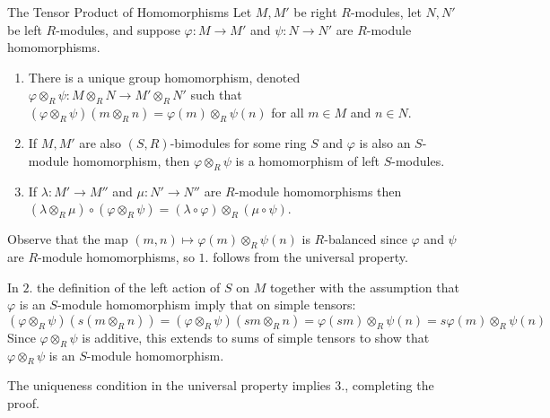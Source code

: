 \documentclass[12pt, a4paper, twoside, openright, titlepage]{book}
\begin{document}
\begin{thm}{The Tensor Product of Homomorphisms}{}
    Let $M,M'$ be right $R$-modules, let $N,N'$ be left $R$-modules, and suppose $\varphi:M\rightarrow M'$ and $\psi:N\rightarrow N'$ are $R$-module homomorphisms.
    \begin{enumerate}
        \item There is a unique group homomorphism, denoted $\varphi\otimes_R\psi:M\otimes_RN\rightarrow M'\otimes_RN'$ such that $(\varphi\otimes_R\psi)(m\otimes_Rn) = \varphi(m)\otimes_R\psi(n)$ for all $m \in M$ and $n \in N$.
        \item If $M,M'$ are also $(S,R)$-bimodules for some ring $S$ and $\varphi$ is also an $S$-module homomorphism, then $\varphi\otimes_R\psi$ is a homomorphism of left $S$-modules. 
        \item If $\lambda:M'\rightarrow M''$ and $\mu:N'\rightarrow N''$ are $R$-module homomorphisms then $(\lambda\otimes_R\mu)\circ(\varphi\otimes_R\psi) = (\lambda\circ \varphi)\otimes_R(\mu\circ\psi)$.
    \end{enumerate}
\end{thm}
\begin{proof*}{}{}
    Observe that the map $(m,n)\mapsto \varphi(m)\otimes_R\psi(n)$ is $R$-balanced since $\varphi$ and $\psi$ are $R$-module homomorphisms, so $1.$ follows from the universal property.

    In $2.$ the definition of the left action of $S$ on $M$ together with the assumption that $\varphi$ is an $S$-module homomorphism imply that on simple tensors: \begin{equation*}
        (\varphi\otimes_R\psi)(s(m\otimes_Rn)) = (\varphi\otimes_R\psi)(sm\otimes_Rn) = \varphi(sm)\otimes_R\psi(n) = s\varphi(m)\otimes_R\psi(n)
    \end{equation*}
    Since $\varphi\otimes_R\psi$ is additive, this extends to sums of simple tensors to show that $\varphi\otimes_R\psi$ is an $S$-module homomorphism. 

    The uniqueness condition in the universal property implies $3.$, completing the proof.
\end{proof*}
\end{document}
